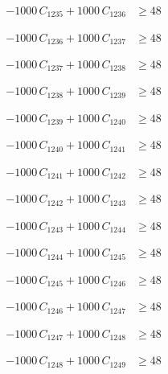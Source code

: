 \documentclass[a4paper,11pt]{article}
\begin{document}
\begin{align}
-1000\,C_{1235} + 1000\,C_{1236} &\geq 48 \nonumber
\end{align}

\begin{align}
-1000\,C_{1236} + 1000\,C_{1237} &\geq 48 \nonumber
\end{align}

\begin{align}
-1000\,C_{1237} + 1000\,C_{1238} &\geq 48 \nonumber
\end{align}

\begin{align}
-1000\,C_{1238} + 1000\,C_{1239} &\geq 48 \nonumber
\end{align}

\begin{align}
-1000\,C_{1239} + 1000\,C_{1240} &\geq 48 \nonumber
\end{align}

\begin{align}
-1000\,C_{1240} + 1000\,C_{1241} &\geq 48 \nonumber
\end{align}

\begin{align}
-1000\,C_{1241} + 1000\,C_{1242} &\geq 48 \nonumber
\end{align}

\begin{align}
-1000\,C_{1242} + 1000\,C_{1243} &\geq 48 \nonumber
\end{align}

\begin{align}
-1000\,C_{1243} + 1000\,C_{1244} &\geq 48 \nonumber
\end{align}

\begin{align}
-1000\,C_{1244} + 1000\,C_{1245} &\geq 48 \nonumber
\end{align}

\begin{align}
-1000\,C_{1245} + 1000\,C_{1246} &\geq 48 \nonumber
\end{align}

\begin{align}
-1000\,C_{1246} + 1000\,C_{1247} &\geq 48 \nonumber
\end{align}

\begin{align}
-1000\,C_{1247} + 1000\,C_{1248} &\geq 48 \nonumber
\end{align}

\begin{align}
-1000\,C_{1248} + 1000\,C_{1249} &\geq 48 \nonumber
\end{align}
\end{document}
